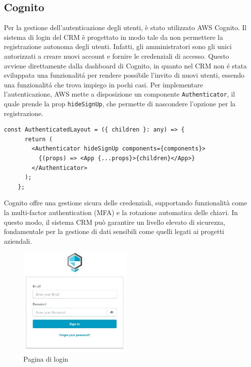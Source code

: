 \documentclass[target=bach,aauheader=,style=]{thud}
\begin{document}
\subsection{Cognito}
Per la gestione dell'autenticazione degli utenti, è stato utilizzato AWS Cognito. Il sistema di login del CRM è progettato in modo tale da non permettere la registrazione autonoma degli utenti. Infatti, gli amministratori sono gli unici autorizzati a creare nuovi account e fornire le credenziali di accesso. Questo avviene direttamente dalla dashboard di Cognito, in quanto nel CRM non é stata sviluppata una funzionalitá per rendere possibile l'invito di nuovi utenti, essendo una funzionalitá che trova impiego in pochi casi. Per implementare l'autenticazione, AWS mette a disposizione un componente \texttt{Authenticator}, il quale prende la prop \texttt{hideSignUp}, che permette di nascondere l'opzione per la registrazione.

\vspace{0.8cm} 
\begin{lstlisting}[caption=Parte del file \texttt{AuthenticatedLayout.tsx} del CRM]
    const AuthenticatedLayout = ({ children }: any) => {
      return (
        <Authenticator hideSignUp components={components}>
          {(props) => <App {...props}>{children}</App>}
        </Authenticator>
      );
    };
\end{lstlisting}


Cognito offre una gestione sicura delle credenziali, supportando funzionalità come la multi-factor authentication (MFA) e la rotazione automatica delle chiavi. In questo modo, il sistema CRM può garantire un livello elevato di sicurezza, fondamentale per la gestione di dati sensibili come quelli legati ai progetti aziendali.

\begin{figure}[htbp]
    \centering
    \vspace{0.8cm} 
    \includegraphics[width=0.5\textwidth]{img/login.pdf} 
    \caption{Pagina di login}
\end{figure}
\end{document}

